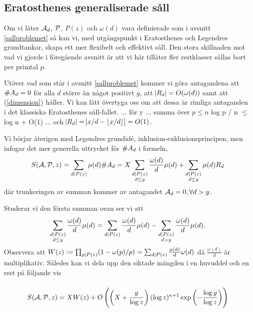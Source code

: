 \subsection{Eratosthenes generaliserade såll}
Om vi låter $\A_d$, $\P$, $P(z)$ och $\omega(d)$ vara definierade som i avsnitt \ref{sallproblemet} så kan vi, med utgångspunkt i Eratosthenes och Legendres grundtankar, skapa ett mer flexibelt och effektivt såll. Den stora skillnaden mot vad vi gjorde i föregående avsnitt är att vi här tillåter fler restklasser sållas bort per primtal $p$. 

Utöver vad som står i avsnitt \ref{sallproblemet} kommer vi göra antagandena att \(\card{A_d} = 0\) för alla \(d\) större än något positivt $y$, att $\abs{R_d} = O(\omega(d))$ samt att (\ref{dimension}) håller. Vi kan lätt övertyga oss om att dessa är rimliga antaganden i det klassiska Eratosthenes såll-fallet. ... för y ... summa över $p \leq n$ log p / n $\leq$ log n + O(1) ... och $\abs{R_d} = \abs{ x/d - \lfloor x / d \rfloor} = O(1)$.

Vi börjar återigen med Legendres grundidé, inklusion-exklusionsprincipen, men infogar det mer generella uttrycket för $\card{A_d}$ i formeln,
\begin{align*}
    \S{A}{P}{z} = \sum_{d \divides P(z)} \mu(d) \card{A_d} = X \sum_{\substack{d \divides P(z) \\ d \leq y}} \frac{\omega(d)}{d} \mu(d) + \sum_{\substack{d \divides P(z)  \\ d \leq y}} \mu(d) R_d 
\end{align*}
där trunkeringen av summan kommer av antagandet \(\A_d = 0, \forall d > y\). 

Studerar vi den första summan ovan ser vi att
\begin{align*}
    \sum_{\substack{d \divides P(z) \\ d \leq y}} \frac{\omega(d)}{d} \mu(d) =
    \sum_{\substack{d \divides P(z)}} \frac{\omega(d)}{d} \mu(d) - \sum_{\substack{d \divides P(z) \\ d > y}} \frac{\omega(d)}{d} \mu(d) .
\end{align*}
Observera att \(W(z) := \prod_{p \divides P(z)} (1 - \omega(p)/p) = \sum_{d \divides P(z)} \frac{\mu(d)}{d} \omega(d)\) då \(\frac{\omega(d)}{d}\) är multiplikativ. Således kan vi dela upp den siktade mängden i en huvuddel och en rest på följande vis
\begin{align*}
    
\end{align*}

\begin{theorem}\label{thm:EratosthenesSieve}

\begin{align*}
    \S{A}{P}{z} = X W(z) + O\left(\left(X + \frac{y}{\log z} \right) (\log z)^{\kappa + 1} \exp{\left(-\frac{\log y}{\log z}\right)} \right)
\end{align*}

\end{theorem}
